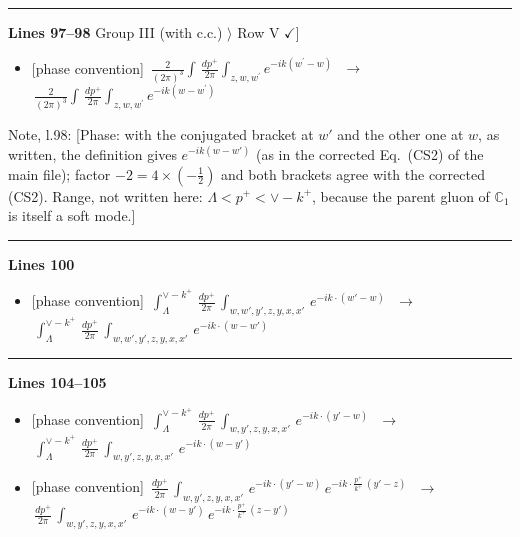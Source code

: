 \documentclass[10pt]{article}
\newenvironment{notebox}{\def\FrameCommand{{\color{notebar}\vrule width 1.5pt}\hspace{6pt}}\MakeFramed{\advance\hsize-\width\FrameRestore}\small}{\endMakeFramed}
\def\mf#1{\mathbb{#1}}
\begin{document}
\noindent\rule{\linewidth}{0.3pt}\par\noindent\textbf{Lines 97--98} \quad \textsf{Group III (with c.c.) $\rangle$ Row V { $\checkmark$]}} \par
\begin{itemize}[leftmargin=2.2em,itemsep=1pt,topsep=2pt]
\item[\textbf{l.97}] \textsf{\small [phase convention]} $\displaystyle \,\frac{2}{(2\pi)^{3}} \int\, \frac{dp^{+}}{2\pi}\int_{z,w,w^{\prime}} e^{-ik(w^{\prime}-w)}\,$\ $\longrightarrow$\ $\displaystyle \,\frac{2}{(2\pi)^{3}} \int\, \frac{dp^{+}}{2\pi}\int_{z,w,w^{\prime}} e^{-ik(w-w^{\prime})}\,$
\end{itemize}
\begin{notebox}\textsf{\small Note, l.98:} [Phase: with the conjugated bracket at $w'$ and the other one at $w$, as written, the definition gives $e^{-ik(w-w')}$ (as in the corrected Eq.~(CS2) of the main file); factor $-2=4\times(-\frac12)$ and both brackets agree with the corrected (CS2). Range, not written here: $\Lambda<p^{+}<\vee-k^{+}$, because the parent gluon of $\mf{C}_1$ is itself a soft mode.]\end{notebox}
\noindent\rule{\linewidth}{0.3pt}\par\noindent\textbf{Lines 100} \par
\begin{itemize}[leftmargin=2.2em,itemsep=1pt,topsep=2pt]
\item[\textbf{l.100}] \textsf{\small [phase convention]} $\displaystyle \,\int_{\Lambda}^{\vee-k^{+}}\, \frac{dp^{+}}{2\pi}\, \int_{w,w',y',z,y,x,x'}\, e^{-ik\cdot (w'-w)}\,$\ $\longrightarrow$\ $\displaystyle \,\int_{\Lambda}^{\vee-k^{+}}\, \frac{dp^{+}}{2\pi}\, \int_{w,w',y',z,y,x,x'}\, e^{-ik\cdot (w-w')}\,$
\end{itemize}
\noindent\rule{\linewidth}{0.3pt}\par\noindent\textbf{Lines 104--105} \par
\begin{itemize}[leftmargin=2.2em,itemsep=1pt,topsep=2pt]
\item[\textbf{l.104}] \textsf{\small [phase convention]} $\displaystyle \,\int_{\Lambda}^{\vee-k^{+}}\, \frac{dp^{+}}{2\pi}\, \int_{w,y',z,y,x,x'}\, e^{-ik\cdot (y'-w)}\,$\ $\longrightarrow$\ $\displaystyle \,\int_{\Lambda}^{\vee-k^{+}}\, \frac{dp^{+}}{2\pi}\, \int_{w,y',z,y,x,x'}\, e^{-ik\cdot (w-y')}\,$
\item[\textbf{l.104}] \textsf{\small [phase convention]} $\displaystyle \, \frac{dp^{+}}{2\pi}\, \int_{w,y',z,y,x,x'}\, e^{-ik\cdot (y'-w)}\, e^{-ik\cdot \frac{p^{+}}{k^{+}}\,(y'-z)}\,$\ $\longrightarrow$\ $\displaystyle \, \frac{dp^{+}}{2\pi}\, \int_{w,y',z,y,x,x'}\, e^{-ik\cdot (w-y')}\, e^{-ik\cdot \frac{p^{+}}{k^{+}}\,(z-y')}\,$
\end{itemize}
\end{document}
